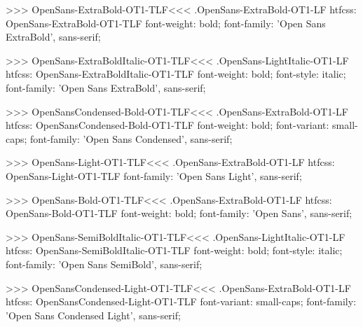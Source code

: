 >>>
\<OpenSans-ExtraBold-OT1-TLF\><<<
.OpenSans-ExtraBold-OT1-LF
htfcss:  OpenSans-ExtraBold-OT1-TLF  font-weight: bold; font-family: 'Open Sans ExtraBold', sans-serif;

>>>
\<OpenSans-ExtraBoldItalic-OT1-TLF\><<<
.OpenSans-LightItalic-OT1-LF
htfcss:  OpenSans-ExtraBoldItalic-OT1-TLF  font-weight: bold; font-style: italic; font-family: 'Open Sans ExtraBold', sans-serif;

>>>
\<OpenSansCondensed-Bold-OT1-TLF\><<<
.OpenSans-ExtraBold-OT1-LF
htfcss:  OpenSansCondensed-Bold-OT1-TLF  font-weight: bold; font-variant: small-caps; font-family: 'Open Sans Condensed', sans-serif;

>>>
\<OpenSans-Light-OT1-TLF\><<<
.OpenSans-ExtraBold-OT1-LF
htfcss:  OpenSans-Light-OT1-TLF  font-family: 'Open Sans Light', sans-serif;

>>>
\<OpenSans-Bold-OT1-TLF\><<<
.OpenSans-ExtraBold-OT1-LF
htfcss:  OpenSans-Bold-OT1-TLF  font-weight: bold; font-family: 'Open Sans', sans-serif;

>>>
\<OpenSans-SemiBoldItalic-OT1-TLF\><<<
.OpenSans-LightItalic-OT1-LF
htfcss:  OpenSans-SemiBoldItalic-OT1-TLF  font-weight: bold; font-style: italic; font-family: 'Open Sans SemiBold', sans-serif;

>>>
\<OpenSansCondensed-Light-OT1-TLF\><<<
.OpenSans-ExtraBold-OT1-LF
htfcss:  OpenSansCondensed-Light-OT1-TLF  font-variant: small-caps; font-family: 'Open Sans Condensed Light', sans-serif;

